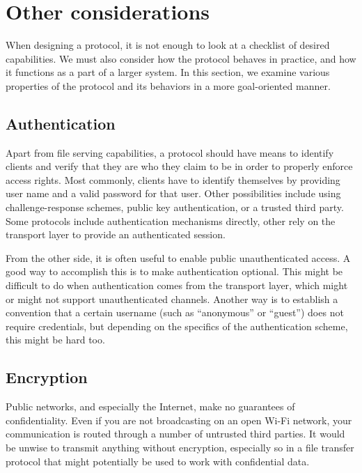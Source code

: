 
\section{Other considerations}

When designing a protocol, it is not enough to look at a checklist of desired capabilities. We must also
consider how the protocol behaves in practice, and how it functions as a part of a larger system. In this
section, we examine various properties of the protocol and its behaviors in a more goal-oriented manner.

\subsection{Authentication}

Apart from file serving capabilities, a protocol should have means to identify clients and verify that they
are who they claim to be in order to properly enforce access rights. Most commonly, clients have to identify
themselves by providing user name and a valid password for that user. Other possibilities include using
challenge-response schemes, public key authentication, or a trusted third party. Some protocols include
authentication mechanisms directly, other rely on the transport layer to provide an authenticated session.

From the other side, it is often useful to enable public unauthenticated access. A good way to accomplish this
is to make authentication optional. This might be difficult to do when authentication comes from the transport
layer, which might or might not support unauthenticated channels. Another way is to establish a convention
that a certain username (such as ``anonymous'' or ``guest'') does not require credentials, but depending on
the specifics of the authentication scheme, this might be hard too.

\subsection{Encryption}

Public networks, and especially the Internet, make no guarantees of confidentiality. Even if you are not
broadcasting on an open Wi-Fi network, your communication is routed through a number of untrusted third
parties. It would be unwise to transmit anything without encryption, especially so in a file transfer protocol
that might potentially be used to work with confidential data.


